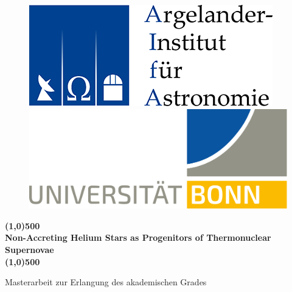 \documentclass[a4paper, 11pt, twoside]{book}
\def\title{Non-Accreting Helium Stars as Progenitors of Thermonuclear Supernovae}
\begin{document}
    \frontmatter  %
    


    
    \begin{titlepage}
    	\begin{figure}[!t]
        
    		\begin{minipage}{.5\textwidth}    
            	\includegraphics[scale=1.6]{../figures/aifa_logo.png}
    		\end{minipage}%
    		\begin{minipage}{0.5\textwidth}
        		\hspace{2.5cm} \includegraphics[scale=0.17]{../figures/uni_logo.png}
		    \end{minipage}
	\end{figure}
 		  
       
        \begin{center} 

            \LARGE
            \textbf{\line(1,0){500}\\ \title \\ \line(1,0){500}}
            
            \vspace{1cm}
            \Large
            Masterarbeit zur Erlangung des akademischen Grades
            
            \vspace{0.3cm}
            

\end{center}
\end{titlepage}
\end{document}
